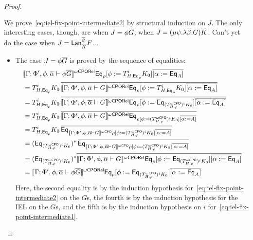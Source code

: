 \documentclass[acmsmall,review,anonymous]{acmart}
\theoremstyle{definition}
\begin{document}
\begin{proof}
\begin{itemize}
We prove~\eqref{eq:iel-fix-point-intermediate2} by structural
induction on $J$. The only interesting cases, though, are when
$J = \phi \overline{G}$, when $J = (\mu \psi.\lambda \overline{\beta}. G)\overline{K}$.
{\color{blue} Can't yet do the case when $J = \mathsf{Lan}_{\overline{K}}^{\overline{\beta}}
  F$...} 
\begin{itemize}
\item The case $J = \phi \overline{G}$ is proved by the sequence of equalities:
\[
\begin{split}
& \llbracket{\Gamma; \Phi', \phi, \overline{\alpha} \vdash \phi
    \overline{G}}\rrbracket^{{\omega\mathsf{CPORel}}} \mathsf{Eq}_{\rho} [\phi := T^i_{H,\mathsf{Eq}_{\rho}} K_0]
  \overline{[\alpha := \mathsf{Eq}_A]}
  \\
&= T^i_{H,\mathsf{Eq}_{\rho}} K_0\, \overline{\llbracket{\Gamma; \Phi',
      \phi, \overline{\alpha} \vdash G}\rrbracket^{{\omega\mathsf{CPORel}}} \mathsf{Eq}_{\rho} [\phi :=
      T^i_{H,\mathsf{Eq}_{\rho}} K_0] \overline{[\alpha :=
        \mathsf{Eq}_A]}} \\ 
&= T^i_{H,\mathsf{Eq}_{\rho}} K_0\, \overline{\llbracket{\Gamma; \Phi',
      \phi, \overline{\alpha} \vdash G}\rrbracket^{{\omega\mathsf{CPORel}}} \mathsf{Eq}_{\rho} [\phi :=
      \mathsf{Eq}_{(T^{\omega\mathsf{CPO}}_{H,\rho})^i K_0}] \overline{[\alpha :=
        \mathsf{Eq}_A]}} \\ 
&= T^i_{H,\mathsf{Eq}_{\rho}} K_0\, \overline{\llbracket{\Gamma; \Phi',
      \phi, \overline{\alpha} \vdash G}\rrbracket^{{\omega\mathsf{CPORel}}} \mathsf{Eq}_{\rho [\phi := (T^{\omega\mathsf{CPO}}_{H,\rho})^i
        K_0] \overline{[\alpha := A]}}} \\ 
&= T^i_{H,\mathsf{Eq}_{\rho}} K_0\, \overline{\mathsf{Eq}_{\llbracket{\Gamma;
        \Phi', \phi, \overline{\alpha} \vdash G}\rrbracket^{{\omega\mathsf{CPO}}} \rho [\phi :=
        (T^{\omega\mathsf{CPO}}_{H,\rho})^i K_0] \overline{[\alpha :=
          A]}}} \\ 
&= (\mathsf{Eq}_{(T^{\omega\mathsf{CPO}}_{H,\rho})^i K_0})^* \,\overline{\mathsf{Eq}_{\llbracket{\Gamma;
        \Phi', \phi, \overline{\alpha} \vdash G}\rrbracket^{{\omega\mathsf{CPO}}} \rho [\phi :=
        (T^{\omega\mathsf{CPO}}_{H,\rho})^i K_0] \overline{[\alpha :=
          A]}}} \\ 
&= (\mathsf{Eq}_{(T^{\omega\mathsf{CPO}}_{H,\rho})^i K_0})^* \overline{\llbracket{\Gamma;
      \Phi', \phi, \overline{\alpha} \vdash G}\rrbracket^{{\omega\mathsf{CPORel}}} \mathsf{Eq}_{\rho} [\phi :=
      \mathsf{Eq}_{(T^{\omega\mathsf{CPO}}_{H,\rho})^i K_0}] \overline{[\alpha :=
        \mathsf{Eq}_A]}} \\ 
&= \llbracket{\Gamma; \Phi', \phi, \overline{\alpha} \vdash \phi \overline{G}}\rrbracket^{{\omega\mathsf{CPORel}}}
  \mathsf{Eq}_{\rho} [\phi := \mathsf{Eq}_{(T^{\omega\mathsf{CPO}}_{H,\rho})^i K_0}]
  \overline{[\alpha := \mathsf{Eq}_A]} 
\end{split}
\]
Here, the second equality is by the induction hypothesis
for~\eqref{eq:iel-fix-point-intermediate2} on the $G$s, the fourth is
by the induction hypothesis for the IEL on the $G$s, and the fifth is
by the induction hypothesis on $i$
for~\eqref{eq:iel-fix-point-intermediate1}.


\end{itemize}
\end{itemize}
\end{proof}
\end{document}
